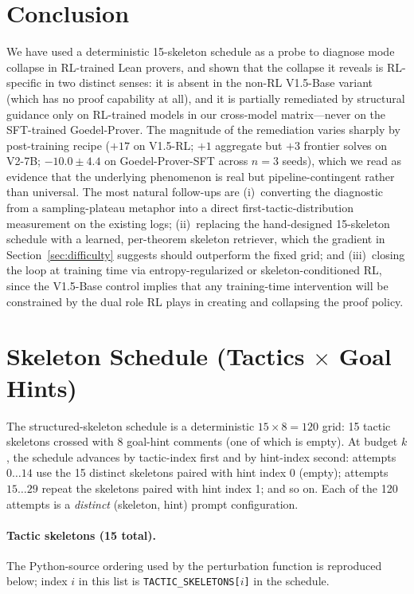 \documentclass{article}
\begin{document}
\section{Conclusion}

We have used a deterministic 15-skeleton schedule as a probe to diagnose mode collapse in RL-trained Lean provers, and shown that the collapse it reveals is RL-specific in two distinct senses: it is absent in the non-RL V1.5-Base variant (which has no proof capability at all), and it is partially remediated by structural guidance only on RL-trained models in our cross-model matrix---never on the SFT-trained Goedel-Prover. The magnitude of the remediation varies sharply by post-training recipe ($+17$ on V1.5-RL; $+1$ aggregate but $+3$ frontier solves on V2-7B; $-10.0 \pm 4.4$ on Goedel-Prover-SFT across $n{=}3$ seeds), which we read as evidence that the underlying phenomenon is real but pipeline-contingent rather than universal. The most natural follow-ups are (i)~converting the diagnostic from a sampling-plateau metaphor into a direct first-tactic-distribution measurement on the existing logs; (ii)~replacing the hand-designed 15-skeleton schedule with a learned, per-theorem skeleton retriever, which the gradient in Section~\ref{sec:difficulty} suggests should outperform the fixed grid; and (iii)~closing the loop at training time via entropy-regularized or skeleton-conditioned RL, since the V1.5-Base control implies that any training-time intervention will be constrained by the dual role RL plays in creating and collapsing the proof policy.






\appendix

\section{Skeleton Schedule (Tactics $\times$ Goal Hints)}
\label{app:skeletons}

The structured-skeleton schedule is a deterministic $15 \times 8 = 120$ grid: 15 tactic skeletons crossed with 8 goal-hint comments (one of which is empty). At budget $k$, the schedule advances by tactic-index first and by hint-index second: attempts $0\ldots14$ use the 15 distinct skeletons paired with hint index 0 (empty); attempts $15\ldots29$ repeat the skeletons paired with hint index 1; and so on. Each of the 120 attempts is a \emph{distinct} (skeleton, hint) prompt configuration.

\paragraph{Tactic skeletons (15 total).}
The Python-source ordering used by the perturbation function is reproduced below; index $i$ in this list is \texttt{TACTIC\_SKELETONS[$i$]} in the schedule.
\end{document}

